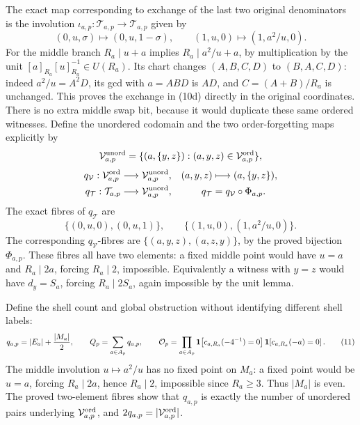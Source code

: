 The exact map corresponding to exchange of the last two original
denominators is the involution
\(\iota_{a,p}:\mathcal T_{a,p}\to\mathcal T_{a,p}\) given by
\[
 (0,u,\sigma)\longmapsto(0,u,1-\sigma),\qquad
 (1,u,0)\longmapsto(1,a^2/u,0). \tag{10d}
\]
For the middle branch \(R_a\mid u+a\) implies
\(R_a\mid a^2/u+a\), by multiplication by the unit
\([a]_{R_a}[u]_{R_a}^{-1}\in U(R_a)\).
Its chart changes \((A,B,C,D)\) to \((B,A,C,D)\): indeed
\(a^2/u=A^2D\), its gcd with \(a=ABD\) is \(AD\), and
\(C=(A+B)/R_a\) is unchanged. This proves the exchange in
(10d) directly in the original coordinates. There is no extra
middle swap bit, because it would duplicate these same ordered
witnesses. Define the unordered codomain and the two order-forgetting
maps explicitly by
\[
 \mathcal V_{a,p}^{\rm unord}
 =\{(a,\{y,z\}):(a,y,z)\in\mathcal V_{a,p}^{\rm ord}\},
\]
\[
 \begin{aligned}
 q_{\mathcal V}:\mathcal V_{a,p}^{\rm ord}&\longrightarrow
    \mathcal V_{a,p}^{\rm unord},&
 (a,y,z)&\longmapsto(a,\{y,z\}),\\
 q_{\mathcal T}:\mathcal T_{a,p}&\longrightarrow
    \mathcal V_{a,p}^{\rm unord},&
 q_{\mathcal T}&=q_{\mathcal V}\circ\Phi_{a,p}.
 \end{aligned}
\]
The exact fibres of \(q_{\mathcal T}\) are
\[
 \{(0,u,0),(0,u,1)\},\qquad
 \{(1,u,0),(1,a^2/u,0)\}.
\]
The corresponding \(q_{\mathcal V}\)-fibres are
\(\{(a,y,z),(a,z,y)\}\), by the proved bijection \(\Phi_{a,p}\).
These fibres all have two elements: a fixed middle point would have
\(u=a\) and \(R_a\mid2a\), forcing \(R_a\mid2\), impossible.
Equivalently a witness with \(y=z\) would have \(d_y=S_a\),
forcing \(R_a\mid2S_a\), again impossible by the unit lemma.

Define the shell count and global obstruction without identifying
different shell labels:
\[
 q_{a,p}=|E_a|+\frac{|M_a|}{2},\qquad
 Q_p=\sum_{a\in A_p}q_{a,p},\qquad
 {\mathcal O}_p=\prod_{a\in A_p}
 {\bf1}\!\left[c_{a,R_a}(-4^{-1})=0\right]
 {\bf1}\!\left[c_{a,R_a}(-a)=0\right]. \tag{11}
\]
The middle involution \(u\mapsto a^2/u\) has no fixed point on
\(M_a\): a fixed point would be \(u=a\), forcing
\(R_a\mid2a\), hence \(R_a\mid2\), impossible since \(R_a\ge3\).
Thus \(|M_a|\) is even. The proved two-element fibres show that
\(q_{a,p}\) is exactly the number of unordered pairs underlying
\(\mathcal V_{a,p}^{\rm ord}\), and
\(2q_{a,p}=|\mathcal V_{a,p}^{\rm ord}|\).

